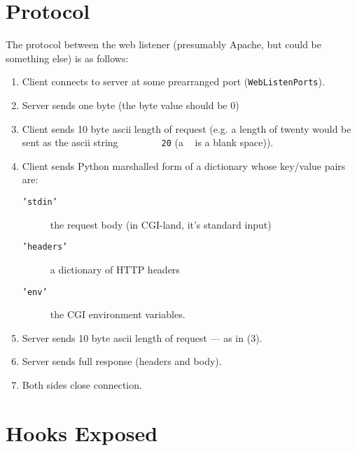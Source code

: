 \documentclass{manual}
\begin{document}
\section{Protocol}
The protocol between the web listener (presumably Apache, but could be
something else) is as follows:
\begin{enumerate}
\item Client connects to server at some prearranged port
(\texttt{WebListenPorts}).
\item Server sends one byte (the byte value should be 0)
\item Client sends 10 byte ascii length of request (e.g. a length of
twenty would be sent as the ascii string \verb*!        20! (a 
\verb*! ! is a blank space)).
\item Client sends Python marshalled form of a dictionary whose
key/value pairs are:
\begin{description}
\item[\texttt{'stdin'}] the request body (in CGI-land, it's standard
input)
\item[\texttt{'headers'}] a dictionary of HTTP headers
\item[\texttt{'env'}] the CGI environment variables.
\end{description}
\item Server sends 10 byte ascii length of request --- as in (3).
\item Server sends full response (headers and body).
\item Both sides close connection.
\end{enumerate}

\section{Hooks Exposed}
\end{document}
